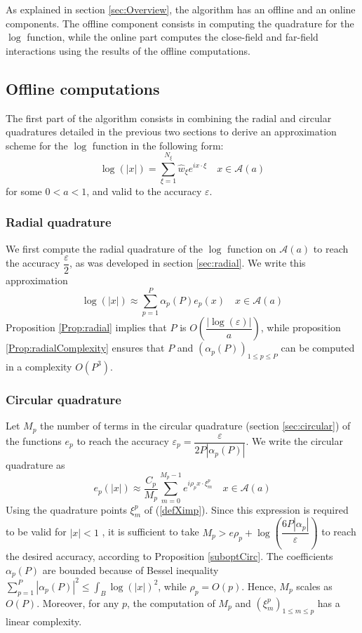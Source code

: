 \documentclass[11pt,a4paper]{article}
\begin{document}
As explained in section \ref{sec:Overview}, the algorithm has an offline and an online components. The offline component consists in computing the quadrature for the $\log$ function, while the online part computes the close-field and far-field interactions using the results of the offline computations. 

\subsection{Offline computations}
The first part of the algorithm consists in combining the radial and circular quadratures detailed in the previous two sections to derive an approximation scheme for the $\log$ function in the following form: 
\[ \log(|x|) = \sum_{\xi=1}^{N_\xi} \hat{w}_{\xi} e^{i x\cdot \xi} \quad x\in \mathcal{A}(a)\]
for some $0<a<1$, and valid to the accuracy $\varepsilon$. 

\subsubsection*{Radial quadrature}
We first compute the radial quadrature of the $\log$ function on $\mathcal{A}(a)$ to reach the accuracy $\dfrac{\varepsilon}{2}$, as was developed in section \ref{sec:radial}. We write this approximation
\[ \log(|x|) \approx \sum_{p=1}^P \alpha_p(P) e_p(x) \quad x \in \mathcal{A}(a)\]
Proposition \ref{Prop:radial} implies that $P$ is $O\left(\dfrac{|\log(\varepsilon)|}{a}\right)$, while proposition \ref{Prop:radialComplexity} ensures that $P$ and $(\alpha_p(P))_{1 \leq p \leq P}$ can be computed in a complexity $O(P^3)$. 

\subsubsection*{Circular quadrature}
Let $M_p$ the number of terms in the circular quadrature (section \ref{sec:circular}) of the functions $e_p$ to reach the accuracy $\varepsilon_p = \dfrac{\varepsilon}{2P |\alpha_p(P)|}$. We write the circular quadrature as 
\[ e_p(|x|) \approx \dfrac{C_p}{M_p}\sum_{m=0}^{M_p-1} {e^{i \rho_p x \cdot \xi^p_{m}}} \quad x \in \mathcal{A}(a)\]
Using the quadrature points $\xi_m^p$ of (\ref{defXimp}). Since this expression is required to be valid for $|x| < 1$ , it is sufficient to take $M_p > e \rho_p + \log\left(\dfrac{6P |\alpha_p|}{\varepsilon}\right)$ to reach the desired accuracy, according to Proposition \ref{suboptCirc}. The coefficients $\alpha_p(P)$ are bounded because of Bessel inequality $\sum_{p=1}^P{|\alpha_p(P)|^2} \leq \int_{B} \log(|x|)^2$, while $\rho_p = O(p)$. Hence, $M_p$ scales as $O(P)$. Moreover, for any $p$, the computation of $M_p$ and $(\xi_m^p)_{1\leq m \leq p}$ has a linear complexity. 
\end{document}

